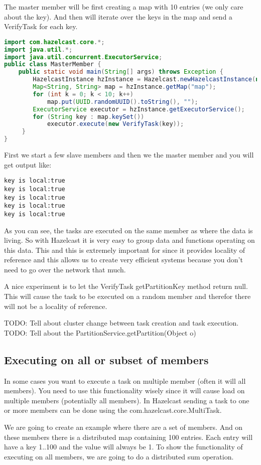 The master member will be first creating a map with 10 entries (we only care about the key). And then will iterate over the keys in the map and send a VerifyTask for each key. 
\begin{lstlisting}[language=java]
import com.hazelcast.core.*;
import java.util.*;
import java.util.concurrent.ExecutorService;
public class MasterMember {
    public static void main(String[] args) throws Exception {
        HazelcastInstance hzInstance = Hazelcast.newHazelcastInstance(null);
        Map<String, String> map = hzInstance.getMap("map");
        for (int k = 0; k < 10; k++) 
            map.put(UUID.randomUUID().toString(), "");
        ExecutorService executor = hzInstance.getExecutorService();
        for (String key : map.keySet()) 
            executor.execute(new VerifyTask(key));
     }
}
\end{lstlisting}
First we start a few slave members and then we the master member and you will get output like:
\begin{lstlisting}
key is local:true
key is local:true
key is local:true
key is local:true
key is local:true
\end{lstlisting}
As you can see, the tasks are executed on the same member as where the data is living. So with Hazelcast it is very easy to group data and functions operating on this data. This  and this is extremely important for since it provides locality of reference and this allows us to create very efficient systems because you don't need to go over the network that much.

A nice experiment is to let the VerifyTask getPartitionKey method return null. This will cause the task to be executed on a random member and therefor there will not be a locality of reference.

TODO: Tell about cluster change between task creation and task execution.
TODO: Tell about the PartitionService.getPartition(Object o)

\subsection{Executing on all or subset of members}
In some cases you want to execute a task on multiple member (often it will all members). You need to use this functionality wisely since it will cause load on multiple members (potentially all members). In Hazelcast sending a task to one or more members can be done using the com.hazelcast.core.MultiTask.

We are going to create an example where there are a set of members. And on these members there is a distributed map containing 100 entries. Each entry will have a key 1..100 and the value will always be 1. To show the functionality of executing on all members, we are going to do a distributed sum operation.

